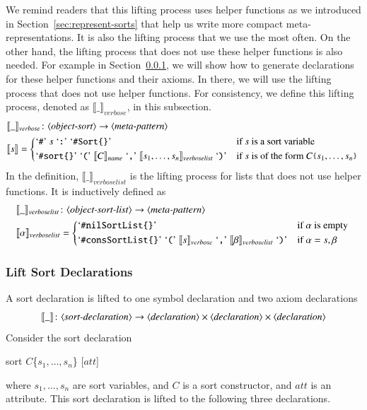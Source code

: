 \documentclass[UTF8,11pt]{article}
\theoremstyle{plain}
\theoremstyle{definition}
\theoremstyle{remark}
\newcommand{\Bracket}[1]{\llbracket#1\rrbracket}
\newcommand{\parametric}[2]{{#1}\raisebox{.2ex}{\texttt{\footnotesize{\{}}}#2\raisebox{.2ex}{\texttt{\footnotesize{\}}}}}
\newcommand{\denote}[1]{\llbracket{#1}\rrbracket}
\newcommand{\sharpsymbol}{\#}
\newcommand{\KSort}{\texttt{\sharpsymbol Sort}}
\newcommand{\quottt}[1]{\textrm{\lq\texttt{#1}\rq}}
\newcommand{\name}{\mathit{name}}
\newcommand{\llist}{\mathit{list}}
\newcommand{\att}{\mathit{att}}
\newcommand{\verbose}{\mathit{verbose}}
\newcommand{\syntacc}[1]{\text{$\langle$\textit{#1}$\rangle$}}
\begin{document}
We remind readers that this lifting process uses helper functions as we
introduced in Section~\ref{sec:represent-sorts} that help us write more compact
meta-representations.
It is also the lifting process that we use the most often.
On the other hand, the lifting process that does not use these helper functions
is also needed.
For example in Section~\ref{sec:lift-sort-decls}, we will show how to generate
declarations for these helper functions and their axioms.
In there, we will use the lifting process that does not use helper functions.
For consistency, we define this lifting process, denoted as
$\Bracket{\_}_\verbose$, in this subsection.
\begin{align*}
&\denote{\_}_\verbose \colon \syntacc{object-sort} \to \syntacc{meta-pattern} \\
&\denote{s} = \begin{cases*}
\quottt{\sharpsymbol} \ s \ \quottt{:} \ \quottt{\KSort\{\}} & if $s$ is a
sort variable \\
\quottt{\sharpsymbol sort\{\}} \
\quottt{(} \
\denote{C}_\name \ \quottt{,} \
\denote{s_1,\dots,s_n}_{\verbose\llist} \
\quottt{)} & if $s$
is of the
form $\parametric{C}{s_1,\dots,s_n}$
\end{cases*}
\end{align*}
In the definition, $\denote{\_}_{\verbose\llist}$ is the lifting process for
lists that does not use helper functions.
It is inductively defined as
\begin{align*}
& \denote{\_}_{\verbose\llist} \colon \syntacc{object-sort-list} \to
\syntacc{meta-pattern} \\
& \denote{\alpha}_{\verbose\llist} =
\begin{cases*}
\quottt{\sharpsymbol nilSortList\{\}} & if $\alpha$ is empty \\
\quottt{\sharpsymbol consSortList\{\}} \
\quottt{(} \
\denote{s}_\verbose \
\quottt{,} \
\denote{\beta}_{\verbose\llist} \
\quottt{)} & if
$\alpha = s,\beta$
\end{cases*}
\end{align*}

\subsubsection{Lift Sort Declarations}
\label{sec:lift-sort-decls}
A sort declaration is lifted to one symbol declaration and two axiom
declarations
$$ \denote{\_} \colon \syntacc{sort-declaration} \to
\syntacc{declaration} \times \syntacc{declaration} \times
\syntacc{declaration}$$
Consider the sort declaration
\begin{center}
 \ttfamily
 sort $C$\{$s_1,\dots,s_n$\} [$\att$]
\end{center}
where $s_1,\dots,s_n$ are sort variables, and $C$ is a sort constructor, and
$\att$ is an attribute.
This sort declaration is lifted to the following three declarations.
\end{document}
